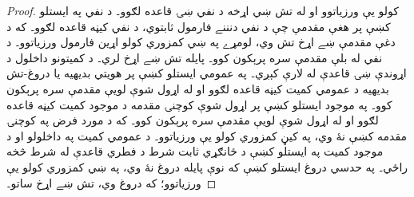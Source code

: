 \documentclass[../../../include/open-logic-section]{subfiles}
\begin{document}
\begin{proof}
کولو يې ورزياتوو او له تش ښي اړخه د نفي ښۍ قاعده لګوو۔
د نفي په ايستلو کښې پر هغې مقدمې چې د نفي دنننے فارمول
ثابتوي، د نفي کيڼه قاعده لګوو۔ که د دغې مقدمې ښے اړخ تش وي،
لومړے په ښي کمزوري کولو اړين فارمول ورزياتوو۔ د نفي له بلې مقدمې سره
پرېکون کوو۔ پايله تش ښے اړخ لري۔
د کميتونو داخلول د اړوندې ښۍ قاعدې له لارې کېږي۔ په عمومي
ايستلو کښې پر هويتي بديهيه يا دروغ-تش بديهيه د عمومي کميت
کيڼه قاعده لګوو او له اړول شوې لويې مقدمې سره پرېکون کوو۔
په موجود ايستلو کښې پر اړول شوې کوچنۍ مقدمه د موجود کميت
کيڼه قاعده لګوو او له اړول شوې لويې مقدمې سره پرېکون کوو۔
که د مورد فرض په کوچنۍ مقدمه کښې نۀ وي، په کيڼ کمزوري کولو
يې ورزياتوو۔ د عمومي کميت په داخلولو او د موجود کميت په
ايستلو کښې د ځانګړي ثابت شرط د فطري قاعدې له شرط څخه راځي۔
په حدسي دروغ ايستلو کښې که نوې پايله دروغ نۀ وي، په ښي
کمزوري کولو يې ورزياتوو؛ که دروغ وي، تش ښے اړخ ساتو۔
\end{proof}
\end{document}
